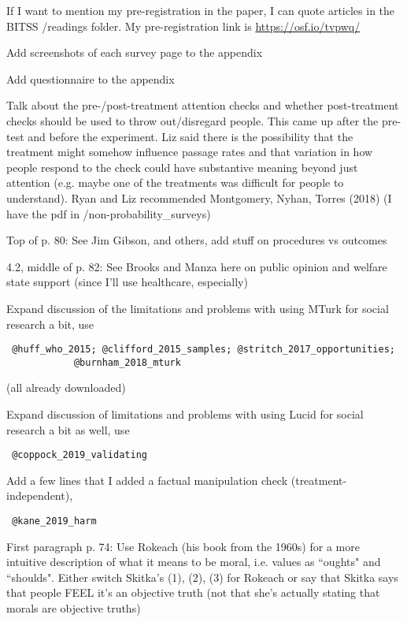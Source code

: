 \documentclass[12pt]{article}
\begin{document}
	\begin{coi}
		\item If I want to mention my pre-registration in the paper, I can quote articles in the BITSS /readings folder. My pre-registration link is \href{https://osf.io/tvpwq/}{https://osf.io/tvpwq/}
		\item Add screenshots of each survey page to the appendix
		\item Add questionnaire to the appendix
		\item Talk about the pre-/post-treatment attention checks and whether post-treatment checks should be used to throw out/disregard people. This came up after the pre-test and before the experiment. Liz said there is the possibility that the treatment might somehow influence passage rates and that variation in how people respond to the check could have substantive meaning beyond just attention (e.g. maybe one of the treatments was difficult for people to understand). Ryan and Liz recommended Montgomery, Nyhan, Torres (2018) (I have the pdf in /non-probability\_surveys)
		\item Top of p. 80:  See Jim Gibson, and others, add stuff on procedures vs outcomes
		\item 4.2, middle of p. 82: See Brooks and Manza here on public opinion and welfare state support (since I'll use healthcare, especially)
		\item Expand discussion of the limitations and problems with using MTurk for social research a bit, use \begin{verbatim} @huff_who_2015; @clifford_2015_samples; @stritch_2017_opportunities; 
			@burnham_2018_mturk \end{verbatim} (all already downloaded)
		\item Expand discussion of limitations and problems with using Lucid for social research a bit as well, use \begin{verbatim} @coppock_2019_validating \end{verbatim}
		\item Add a few lines that I added a factual manipulation check (treatment-independent), \begin{verbatim} @kane_2019_harm \end{verbatim}
		\item First paragraph p. 74: Use Rokeach (his book from the 1960s) for a more intuitive description of what it means to be moral, i.e. values as ``oughts" and ``shoulds". Either switch Skitka's (1), (2), (3) for Rokeach or say that Skitka says that people FEEL it's an objective truth (not that she's actually stating that morals are objective truths)

\end{coi}
\end{document}
